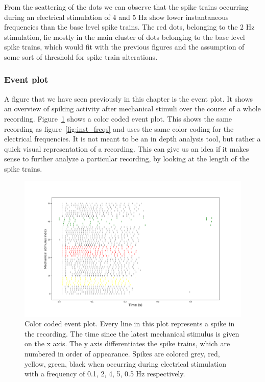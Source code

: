 From the scattering of the dots we can observe that the spike trains occurring during an electrical stimulation of 4 and 5 Hz show lower instantaneous frequencies than the base level spike trains. The red dots, belonging to the 2 Hz stimulation, lie mostly in the main cluster of dots belonging to the base level spike trains, which would fit with the previous figures and the assumption of some sort of threshold for spike train alterations.

\subsubsection{Event plot}
A figure that we have seen previously in this chapter is the event plot. It shows an overview of spiking activity after mechanical stimuli over the course of a whole recording. Figure~\ref{fig:event_color} shows a color coded event plot. This shows the same recording as figure~\ref{fig:inst_freqs} and uses the same color coding for the electrical frequencies. It is not meant to be an in depth analysis tool, but rather a quick visual representation of a recording. This can give us an idea if it makes sense to further analyze a particular recording, by looking at the length of the spike trains.

\begin{figure}
	\includegraphics[width = \textwidth]{src/pic/11_12_13U1bevent_color}
	\caption{Color coded event plot. Every line in this plot represents a spike in the recording. The time since the latest mechanical stimulus is given on the x axis. The y axis differentiates the spike trains, which are numbered in order of appearance. Spikes are colored grey, red, yellow, green, black when occurring during electrical stimulation with a frequency of 0.1, 2, 4, 5, 0.5 Hz respectively.}
	\label{fig:event_color}
\end{figure}







\cleardoublepage

